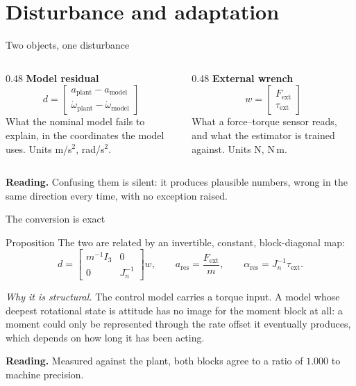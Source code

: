 \documentclass[10pt]{beamer}
\newcommand{\takeaway}[1]{\par\vfill{\footnotesize\textbf{Reading.} #1\par}}
\begin{document}
\section{Disturbance and adaptation}

\begin{frame}{Two objects, one disturbance}
  \begin{columns}[T]
    \begin{column}{0.48\textwidth}
      \textbf{Model residual}
      \[
        d=\begin{bmatrix}
          a_{\mathrm{plant}}-a_{\mathrm{model}}\\
          \dot\omega_{\mathrm{plant}}-\dot\omega_{\mathrm{model}}
        \end{bmatrix}
      \]
      \footnotesize What the nominal model fails to explain, in the
      coordinates the model uses. Units m/s$^2$, rad/s$^2$.
    \end{column}
    \begin{column}{0.48\textwidth}
      \textbf{External wrench}
      \[
        w=\begin{bmatrix}F_{\mathrm{ext}}\\ \tau_{\mathrm{ext}}\end{bmatrix}
      \]
      \footnotesize What a force--torque sensor reads, and what the estimator
      is trained against. Units N, N$\,$m.
    \end{column}
  \end{columns}
  \takeaway{Confusing them is silent: it produces plausible numbers, wrong in
    the same direction every time, with no exception raised.}
\end{frame}

\begin{frame}{The conversion is exact}
  \begin{block}{Proposition}
    The two are related by an invertible, constant, block-diagonal map:
    \[
      d=\begin{bmatrix}m^{-1}I_3 & 0\\ 0 & J_n^{-1}\end{bmatrix}w,
      \qquad
      a_{\mathrm{res}}=\frac{F_{\mathrm{ext}}}{m},
      \qquad
      \alpha_{\mathrm{res}}=J_n^{-1}\tau_{\mathrm{ext}} .
    \]
  \end{block}
  \emph{Why it is structural.} The control model carries a torque input. A
  model whose deepest rotational state is attitude has no image for the moment
  block at all: a moment could only be represented through the rate offset it
  eventually produces, which depends on how long it has been acting.
  \takeaway{Measured against the plant, both blocks agree to a ratio of
    $1.000$ to machine precision.}
\end{frame}
\end{document}
